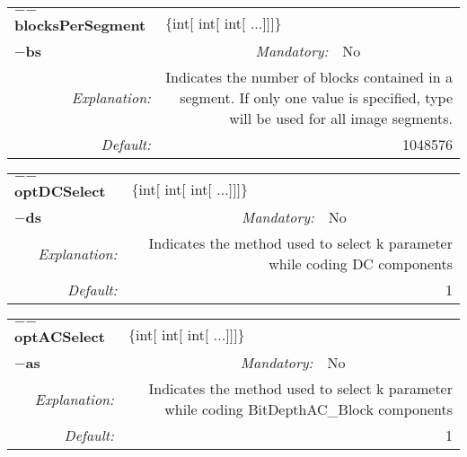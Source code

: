 \begin{center}\begin{tabular}{|rr|rlrl|}
\hline
\multicolumn{2}{|l|}{\textbf{$-$$-$blocksPerSegment}} & \multicolumn{4}{|l|}{$\{$int$[$ int$[$ int$[$ ...$]$$]$$]$$\}$} \\
\cline{3-6}
\multicolumn{2}{|l|}{\textbf{$-$bs}} & \emph{Mandatory:} & No & &  \\
\hline
\emph{Explanation:} & \multicolumn{5}{|p{12cm}|}{Indicates the number of blocks contained in a segment. If only one value is specified, type will be used for all image segments.} \\
\hline
\emph{Default:} & \multicolumn{5}{|p{12cm}|}{1048576 } \\
\hline
\end{tabular}\end{center}
\begin{center}\begin{tabular}{|rr|rlrl|}
\hline
\multicolumn{2}{|l|}{\textbf{$-$$-$optDCSelect}} & \multicolumn{4}{|l|}{$\{$int$[$ int$[$ int$[$ ...$]$$]$$]$$\}$} \\
\cline{3-6}
\multicolumn{2}{|l|}{\textbf{$-$ds}} & \emph{Mandatory:} & No & &  \\
\hline
\emph{Explanation:} & \multicolumn{5}{|p{12cm}|}{Indicates the method used to select k parameter while coding DC components} \\
\hline
\emph{Default:} & \multicolumn{5}{|p{12cm}|}{1 } \\
\hline
\end{tabular}\end{center}
\begin{center}\begin{tabular}{|rr|rlrl|}
\hline
\multicolumn{2}{|l|}{\textbf{$-$$-$optACSelect}} & \multicolumn{4}{|l|}{$\{$int$[$ int$[$ int$[$ ...$]$$]$$]$$\}$} \\
\cline{3-6}
\multicolumn{2}{|l|}{\textbf{$-$as}} & \emph{Mandatory:} & No & &  \\
\hline
\emph{Explanation:} & \multicolumn{5}{|p{12cm}|}{Indicates the method used to select k parameter while coding BitDepthAC\_Block components} \\
\hline
\emph{Default:} & \multicolumn{5}{|p{12cm}|}{1 } \\
\hline
\end{tabular}\end{center}
